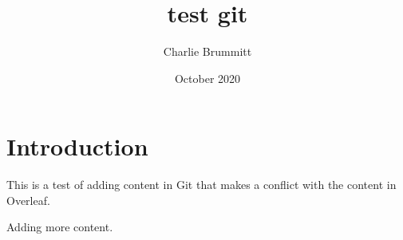 \documentclass{article}
\title{test git}
\author{Charlie Brummitt}
\date{October 2020}
\begin{document}
\maketitle

\section{Introduction}
This is a test of adding content in Git that makes a conflict with the content in Overleaf.


Adding more content.
\end{document}
